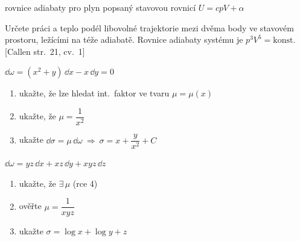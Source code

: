 \begin{priklad}[Příklad 1.*]
rovnice adiabaty pro plyn popsaný stavovou rovnicí $U = cpV + \alpha$
\end{priklad}

\begin{priklad}[Příklad 3.*]
Určete práci a teplo podél libovolné trajektorie mezi dvěma body ve stavovém prostoru, ležícími na téže adiabatě. Rovnice adiabaty systému je $p^3V^5 = \text{konst}$. [Callen str.\ 21, cv.\ 1]
\end{priklad}

\begin{priklad}[1) $k = 2$]
$\dd\omega = (x^2 + y)\,\dd x - x\,\dd y = 0$
\begin{enumerate}[label=\alph*)]
  \item ukažte, že lze hledat int.\ faktor ve tvaru $\mu = \mu(x)$
  \item ukažte, že $\mu = \dfrac{1}{x^2}$
  \item ukažte $\dd\sigma = \mu\,\dd\omega \ \Rightarrow\ \sigma = x + \dfrac{y}{x^2} + C$
\end{enumerate}
\end{priklad}

\begin{priklad}[2) $k = 3$]
$\dd\omega = yz\,\dd x + xz\,\dd y + xyz\,\dd z$
\begin{enumerate}[label=\alph*)]
  \item ukažte, že $\exists\,\mu$ \quad (rce 4)
  \item ověřte $\mu = \dfrac{1}{xyz}$
  \item ukažte $\sigma = \log x + \log y + z$
\end{enumerate}
\end{priklad}

